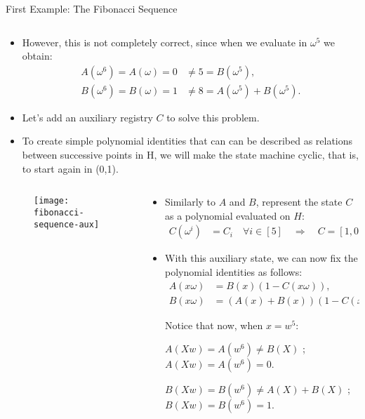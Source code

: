 \begin{frame}[allowframebreaks]{First Example: The Fibonacci Sequence}
\begin{columns}
\begin{column}{0.7\textwidth}
\begin{itemize}
\item However, this is not completely correct, since when we evaluate in $\omega^5$ we obtain:
\begin{align*}
A(\omega^6) = A(\omega) = 0 &\neq  5 = B(\omega^5), \\
B(\omega^6) = B(\omega) = 1 &\neq  8 = A(\omega^5) + B(\omega^5).
\end{align*}

\item Let's add an auxiliary registry $C$ to solve this problem.
\item To create simple polynomial identities that can can be described as relations between successive points in H, 
we will make the state machine cyclic, that is, to start again in (0,1).
\end{itemize}
\end{column}
\end{columns}

\begin{columns}
\begin{column}{0.4\textwidth}
\begin{figure}
	\texttt{[image: fibonacci-sequence-aux]}
\end{figure}
\end{column}
\begin{column}{0.6\textwidth}
\begin{itemize}
\small
\item Similarly to $A$ and $B$, represent the state $C$ as a polynomial evaluated on $H$:
\begin{align*}
C(\omega^i) &= C_i \quad \forall i \in [5] \quad \Longrightarrow \quad C = [1, 0, 0, 0, 0].
\end{align*}
\item With this auxiliary state, we can now fix the polynomial identities as follows:
\begin{align*}
A(x\omega) &=  B(x)(1 - C(x\omega)), \\
B(x\omega) &=  (A(x) + B(x))(1 - C(x\omega)) + C(x\omega).
\end{align*}

Notice that now, when $x = w^5$:

$A(Xw) = A(w^6) \neq B(X)$ ; $A(Xw) = A(w^6) = 0$.

$B(Xw) = B(w^6) \neq A(X)+B(X)$ ; $B(Xw) = B(w^6) = 1$.
\end{itemize}
\end{column}
\end{columns}
\end{frame}



